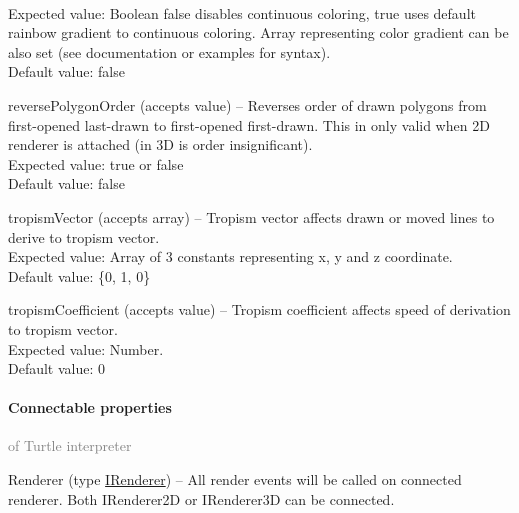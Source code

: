 \begin{description*}
			\\ Expected value: Boolean false disables continuous coloring, true uses default rainbow gradient to continuous coloring.
            	Array representing color gradient can be also set (see documentation or examples for syntax).
			\\ Default value: false
		\item[reversePolygonOrder]
		(accepts value)
			-- Reverses order of drawn polygons from first-opened last-drawn to first-opened first-drawn.
            This in only valid when 2D renderer is attached (in 3D is order insignificant).
			\\ Expected value: true or false
			\\ Default value: false
		\item[tropismVector]
		(accepts array)
			-- Tropism vector affects drawn or moved lines to derive to tropism vector.
			\\ Expected value: Array of 3 constants representing x, y and z coordinate.
			\\ Default value: \{0, 1, 0\}
		\item[tropismCoefficient]
		(accepts value)
			-- Tropism coefficient affects speed of derivation to tropism vector.
			\\ Expected value: Number.
			\\ Default value: 0
	\end{description*}
	\paragraph{Connectable properties}\textcolor{gray}{of Turtle interpreter}
	\begin{description*}
		\item[Renderer]
		(type \hyperref[Malsys.Processing.Components.IRenderer]{IRenderer})
			-- All render events will be called on connected renderer.
            Both IRenderer2D or IRenderer3D can be connected.
	\end{description*}
